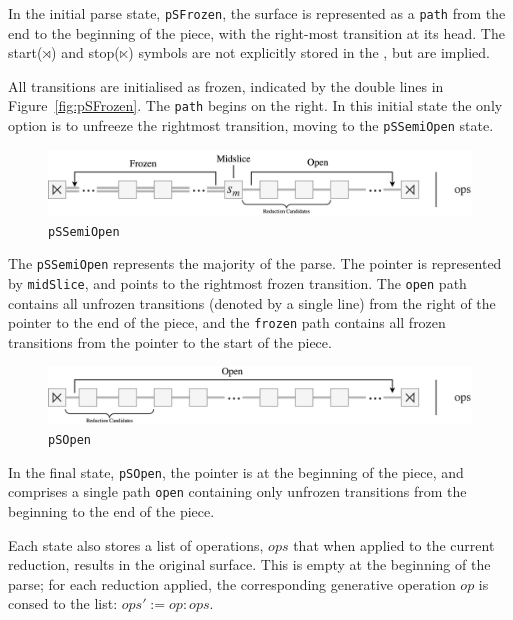 \documentclass[12pt,a4paper,twoside,openright]{report} \usepackage[pdfborder={0 0 0}]{hyperref}    %
\theoremstyle{definition} \newtheorem{definition}{Definition}[section]
\begin{document}
      In the initial parse state, \texttt{pSFrozen}, the surface is represented as a \texttt{path} from the end to the
      beginning of the piece, with the right-most transition at its head. The start($\rtimes$) and stop($\ltimes$)
      symbols are not explicitly stored in the , but are implied.

      All transitions are initialised as frozen, indicated by the double lines in Figure~\ref{fig:pSFrozen}. The
      \texttt{path} begins on the right. In this initial state the only option is to unfreeze the rightmost transition,
      moving to the \texttt{pSSemiOpen} state. 

      \begin{figure}[h] \centering\includegraphics[width=\textwidth]{impl/parseState/semiopen.png}
      \caption{\texttt{pSSemiOpen}} \label{fig:pSSemiOpen} \end{figure}

      The \texttt{pSSemiOpen} represents the majority of the parse. The pointer is represented by \texttt{midSlice}, and
      points to the rightmost frozen transition. The \texttt{open} path contains all unfrozen transitions (denoted by
      a single line) from the right of the pointer to the end of the piece, and the \texttt{frozen} path contains all
      frozen transitions from the pointer to the start of the piece.

      \begin{figure}[h] \centering\includegraphics[width=\textwidth]{impl/parseState/open.png} \caption{\texttt{pSOpen}}
      \label{fig:pSOpen} \end{figure}

      In the final state, \texttt{pSOpen}, the pointer is at the beginning of the piece, and comprises a single path
      \texttt{open} containing only unfrozen transitions from the beginning to the end of the piece.

      Each state also stores a list of operations, $ops$ that when applied to the current reduction, results in the
      original surface. This is empty at the beginning of the parse; for each reduction applied, the corresponding
      generative operation $op$ is consed to the list: $ops' := op:ops$. 
\end{document}
